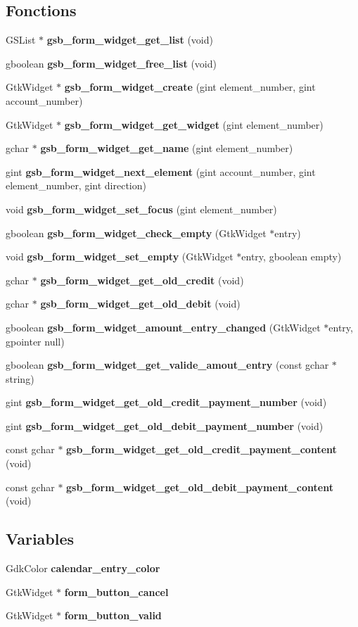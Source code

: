 \subsection*{Fonctions}
\begin{DoxyCompactItemize}
\item 
GSList $\ast$ {\bf gsb\_\-form\_\-widget\_\-get\_\-list} (void)
\item 
gboolean {\bf gsb\_\-form\_\-widget\_\-free\_\-list} (void)
\item 
GtkWidget $\ast$ {\bf gsb\_\-form\_\-widget\_\-create} (gint element\_\-number, gint account\_\-number)
\item 
GtkWidget $\ast$ {\bf gsb\_\-form\_\-widget\_\-get\_\-widget} (gint element\_\-number)
\item 
gchar $\ast$ {\bf gsb\_\-form\_\-widget\_\-get\_\-name} (gint element\_\-number)
\item 
gint {\bf gsb\_\-form\_\-widget\_\-next\_\-element} (gint account\_\-number, gint element\_\-number, gint direction)
\item 
void {\bf gsb\_\-form\_\-widget\_\-set\_\-focus} (gint element\_\-number)
\item 
gboolean {\bf gsb\_\-form\_\-widget\_\-check\_\-empty} (GtkWidget $\ast$entry)
\item 
void {\bf gsb\_\-form\_\-widget\_\-set\_\-empty} (GtkWidget $\ast$entry, gboolean empty)
\item 
gchar $\ast$ {\bf gsb\_\-form\_\-widget\_\-get\_\-old\_\-credit} (void)
\item 
gchar $\ast$ {\bf gsb\_\-form\_\-widget\_\-get\_\-old\_\-debit} (void)
\item 
gboolean {\bf gsb\_\-form\_\-widget\_\-amount\_\-entry\_\-changed} (GtkWidget $\ast$entry, gpointer null)
\item 
gboolean {\bf gsb\_\-form\_\-widget\_\-get\_\-valide\_\-amout\_\-entry} (const gchar $\ast$string)
\item 
gint {\bf gsb\_\-form\_\-widget\_\-get\_\-old\_\-credit\_\-payment\_\-number} (void)
\item 
gint {\bf gsb\_\-form\_\-widget\_\-get\_\-old\_\-debit\_\-payment\_\-number} (void)
\item 
const gchar $\ast$ {\bf gsb\_\-form\_\-widget\_\-get\_\-old\_\-credit\_\-payment\_\-content} (void)
\item 
const gchar $\ast$ {\bf gsb\_\-form\_\-widget\_\-get\_\-old\_\-debit\_\-payment\_\-content} (void)
\end{DoxyCompactItemize}
\subsection*{Variables}
\begin{DoxyCompactItemize}
\item 
GdkColor {\bf calendar\_\-entry\_\-color}
\item 
GtkWidget $\ast$ {\bf form\_\-button\_\-cancel}
\item 
GtkWidget $\ast$ {\bf form\_\-button\_\-valid}
\end{DoxyCompactItemize}


